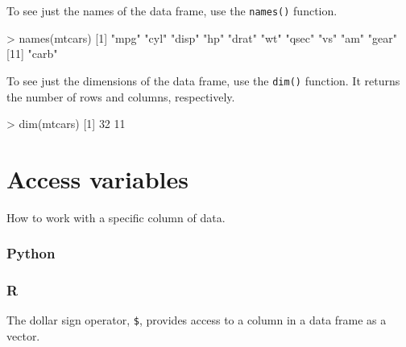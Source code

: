 \documentclass[
]{book}
\newenvironment{Shaded}{\begin{snugshade}}{\end{snugshade}}
\newcommand{\DecValTok}[1]{\textcolor[rgb]{0.00,0.00,0.81}{#1}}
\newcommand{\FunctionTok}[1]{\textcolor[rgb]{0.00,0.00,0.00}{#1}}
\newcommand{\NormalTok}[1]{#1}
\newcommand{\SpecialCharTok}[1]{\textcolor[rgb]{0.00,0.00,0.00}{#1}}
\newcommand{\StringTok}[1]{\textcolor[rgb]{0.31,0.60,0.02}{#1}}
\begin{document}
To see just the names of the data frame, use the \texttt{names()} function.

\begin{Shaded}
\begin{Highlighting}[]
\SpecialCharTok{\textgreater{}} \FunctionTok{names}\NormalTok{(mtcars)}
\NormalTok{ [}\DecValTok{1}\NormalTok{] }\StringTok{"mpg"}  \StringTok{"cyl"}  \StringTok{"disp"} \StringTok{"hp"}   \StringTok{"drat"} \StringTok{"wt"}   \StringTok{"qsec"} \StringTok{"vs"}   \StringTok{"am"}   \StringTok{"gear"}
\NormalTok{[}\DecValTok{11}\NormalTok{] }\StringTok{"carb"}
\end{Highlighting}
\end{Shaded}

To see just the dimensions of the data frame, use the \texttt{dim()} function. It returns the number of rows and columns, respectively.

\begin{Shaded}
\begin{Highlighting}[]
\SpecialCharTok{\textgreater{}} \FunctionTok{dim}\NormalTok{(mtcars)}
\NormalTok{[}\DecValTok{1}\NormalTok{] }\DecValTok{32} \DecValTok{11}
\end{Highlighting}
\end{Shaded}

\hypertarget{access-variables}{%
\section{Access variables}\label{access-variables}}

How to work with a specific column of data.

\hypertarget{python-15}{%
\subsubsection*{Python}\label{python-15}}

\hypertarget{r-15}{%
\subsubsection*{R}\label{r-15}}

The dollar sign operator, \texttt{\$}, provides access to a column in a data frame as a vector.
\end{document}
